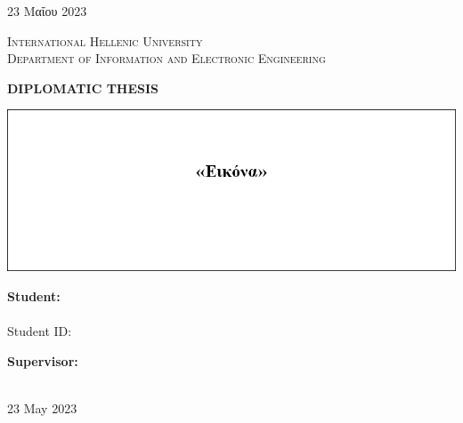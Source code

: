 \begin{titlepage}
{    \vfill
    {23 Μαΐου 2023}
}{
    \textsc{\huge International Hellenic University}\\
    \textsc{\large Department of Information and Electronic Engineering}

    \vspace{2cm}

    \textbf{\Large DIPLOMATIC THESIS}\\
    \vspace{0.5cm}
    \textbf{\LARGE \thesisTitle}

    \vspace{1.5cm}

    \includegraphics[width=14cm]{images/titlepage/Cover-Image-Placeholder.png}

    \vspace{50pt}

    \begin{minipage}[t]{0.45\textwidth}
    \raggedright
    \textbf{Student:}\\
    \studentName\\
    Student ID: \studentID
    \end{minipage}
    \hspace{1cm}
    \begin{minipage}[t]{0.45\textwidth}
    \raggedleft
    \textbf{Supervisor:}\\
    \supervisorName\\
    \end{minipage}

    \vfill
    { 23 May 2023}
}
\end{titlepage}
